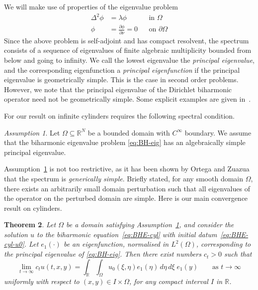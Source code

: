 \documentclass[a4paper, reqno]{amsart}
\numberwithin{equation}{section}
\theoremstyle{plain}
\newtheorem{theorem}{Theorem}[section]
\theoremstyle{definition}
\theoremstyle{remark}
\newtheorem{assumption}[theorem]{Assumption}
\newcommand{\RR}{\mathbb{R}}
\begin{document}
We will make use of properties of the eigenvalue problem
\begin{equation}
  \label{eq:BH-eig}
  \begin{aligned}
    \Delta^2 \phi & = \lambda \phi                           &  & \text{in } \Omega         \\
    \phi          & = \frac{\partial \phi}{\partial \nu} = 0 &  & \text{on } \partial\Omega
  \end{aligned}
\end{equation}
Since the above problem is self-adjoint and has compact resolvent, the spectrum consists of a sequence of eigenvalues of finite algebraic multiplicity bounded from below and going to infinity. We call the lowest eigenvalue the \emph{principal eigenvalue}, and the corresponding eigenfunction a \emph{principal eigenfunction} if the principal eigenvalue is geometrically simple. This is the case in second order problems. However, we note that the principal eigenvalue of the Dirichlet biharmonic operator need not be geometrically simple. Some explicit examples are given in~\cite[Section 3]{SS20}.

For our result on infinite cylinders requires the following spectral condition.
\begin{assumption}
  \label{simple}
  Let $\Omega \subseteq \RR^N$ be a bounded domain with $C^\infty$ boundary. We assume that the biharmonic eigenvalue problem \eqref{eq:BH-eig} has an algebraically simple principal eigenvalue.
\end{assumption}

Assumption~\ref{simple} is not too restrictive, as it has been shown by Ortega and Zuazua~\cite{OZ} that the spectrum is \emph{generically simple}. Briefly stated, for any smooth domain $\Omega$, there exists an arbitrarily small domain perturbation such that all eigenvalues of the operator on the perturbed domain are simple. Here is our main convergence result on cylinders.

\begin{theorem}
  \label{thm:BHE-cyl}
  Let $\Omega$ be a domain satisfying Assumption~\ref{simple}, and consider the solution $u$ to the biharmonic equation~\eqref{eq:BHE-cyl} with initial datum~\eqref{eq:BHE-cyl-u0}. Let $e_1(\cdot)$ be an eigenfunction, normalised in $L^2(\Omega)$, corresponding to the principal eigenvalue of \eqref{eq:BH-eig}. Then there exist numbers $c_t > 0$ such that
  \begin{equation}
    \label{eq:BHE-cyl-blowup-limit}
    \lim_{t\to\infty}c_t u(t,x,y)
    =\int_{\RR}\int_\Omega u_0(\xi,\eta) e_1(\eta) \,d\eta\,d\xi \; e_1(y)
    \qquad \text{as } t \to \infty
  \end{equation}
  uniformly with respect to $(x,y)\in I \times \Omega$, for any compact interval $I$ in $\RR$.
\end{theorem}
\end{document}
